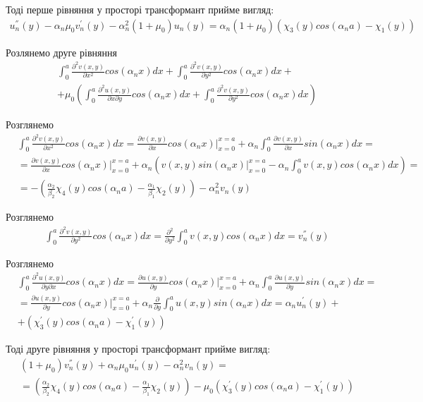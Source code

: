 Тоді перше рівняння у просторі трансформант прийме вигляд:
\begin{align*}
    u_n^{''}(y) - \alpha_n \mu_0 v_n^{'}(y) - \alpha_n^2 (1 + \mu_0) u_n(y) = \alpha_n(1 + \mu_0)(\chi_3(y) cos(\alpha_n a) - \chi_1(y))
\end{align*}

Розлянемо друге рівняння
\begin{align*}
    &\int_{0}^{a} \frac{\partial^2 v(x,y)}{\partial x^2} cos(\alpha_n x)dx + \int_{0}^{a} \frac{\partial^2 v(x,y)}{\partial y^2} cos(\alpha_n x)dx + \\ 
    & + \mu_0 \left( \int_{0}^{a} \frac{\partial^2 u(x,y)}{\partial x \partial y} cos(\alpha_n x)dx +  \int_{0}^{a} \frac{\partial^2 v(x,y)}{\partial y^2} cos(\alpha_n x) dx\right)
\end{align*}

Розглянемо
\begin{align*}
    &\int_{0}^{a} \frac{\partial^2 v(x,y)}{\partial x^2} cos(\alpha_n x)dx = \frac{\partial v(x,y)}{\partial x} cos(\alpha_n x) |_{x=0}^{x=a} + \alpha_n \int_{0}^{a} \frac{\partial v(x,y)}{\partial x} sin(\alpha_n x) dx = \\
    &=\frac{\partial v(x,y)}{\partial x} cos(\alpha_n x) |_{x=0}^{x=a} + \alpha_n \left(v(x,y) sin(\alpha_n x)|_{x=0}^{x=a} - \alpha_n \int_{0}^{a} v(x,y) cos(\alpha_n x) dx  \right) = \\
    &= -(\frac{\alpha_2}{\beta_2}\chi_4(y) cos(\alpha_n a) - \frac{\alpha_1}{\beta_1}\chi_2(y)) -\alpha_n^2 v_n(y)
\end{align*}

Розглянемо
\begin{align*}
    &\int_{0}^{a} \frac{\partial^2 v(x,y)}{\partial y^2} cos(\alpha_n x)dx = \frac{\partial^2}{\partial y^2} \int_{0}^{a} v(x,y) cos(\alpha_n x)dx = v_n^{''}(y)
\end{align*}

Розглянемо
\begin{align*}
    &\int_{0}^{a} \frac{\partial^2 u(x,y)}{\partial y \partial x} cos(\alpha_n x)dx = \frac{\partial u(x,y)}{\partial y} cos(\alpha_n x) |_{x=0}^{x=a} + \alpha_n \int_{0}^{a} \frac{\partial u(x,y)}{\partial y} sin(\alpha_n x) dx = \\
    &=\frac{\partial u(x,y)}{\partial y} cos(\alpha_n x) |_{x=0}^{x=a} + \alpha_n \frac{\partial}{\partial y} \int_{0}^{a} u(x,y) sin(\alpha_n x) dx = \alpha_n u_n^{'}(y) + \\
    &+(\chi_3^{'}(y) cos(\alpha_n a) -\chi_1^{'}(y))
\end{align*}

Тоді друге рівняння у просторі трансформант прийме вигляд:
\begin{align*}
    &(1 + \mu_0) v_n^{''}(y) + \alpha_n \mu_0 u_n^{'}(y)  - \alpha_n^2 v_n(y) = \\ 
    &= (\frac{\alpha_2}{\beta_2}\chi_4(y) cos(\alpha_n a) - \frac{\alpha_1}{\beta_1}\chi_2(y)) - \mu_0 (\chi_3^{'}(y) cos(\alpha_n a) -\chi_1^{'}(y))
\end{align*}


